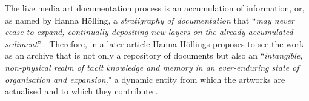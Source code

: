 The live media art documentation process is an accumulation of information, or, as named by Hanna Hölling, a \textit{stratigraphy of documentation} that ``\textit{may never cease to expand, continually depositing new layers on the already accumulated sediment}'' \cite{holling2016aesthetics}. Therefore, in a later article Hanna Höllings proposes to see the work as an archive that is not only a repository of documents but also an ``\textit{intangible, non-physical realm of tacit knowledge and memory in an ever-enduring state of organisation and expansion,}" \cite{holling2017paik} a dynamic entity from which the artworks are actualised and to which they contribute \cite{van2024conservation}.

